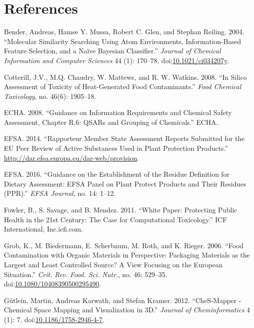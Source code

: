 \documentclass[]{achemso}
\begin{document}
\section*{References}\label{references}

\hypertarget{refs}{}
\hypertarget{ref-doi:10.1021ux2fci034207y}{}
Bender, Andreas, Hamse Y. Mussa, Robert C. Glen, and Stephan Reiling.
2004. ``Molecular Similarity Searching Using Atom Environments,
Information-Based Feature Selection, and a Naïve Bayesian Classifier.''
\emph{Journal of Chemical Information and Computer Sciences} 44 (1):
170--78.
doi:\href{https://doi.org/10.1021/ci034207y}{10.1021/ci034207y}.

\hypertarget{ref-Cotterill2008}{}
Cotterill, J.V., M.Q. Chaudry, W. Mattews, and R. W. Watkins. 2008. ``In
Silico Assessment of Toxicity of Heat-Generated Food Contaminants.''
\emph{Food Chemical Toxicology}, no. 46(6): 1905--18.

\hypertarget{ref-ECHA2008}{}
ECHA. 2008. ``Guidance on Information Requirements and Chemical Safety
Assessment, Chapter R.6: QSARs and Grouping of Chemicals.'' ECHA.

\hypertarget{ref-EFSA2014}{}
EFSA. 2014. ``Rapporteur Member State Assessment Reports Submitted for
the EU Peer Review of Active Substances Used in Plant Protection
Products.'' \url{http://dar.efsa.europa.eu/dar-web/provision}.

\hypertarget{ref-EFSA2016}{}
EFSA. 2016. ``Guidance on the Establishment of the Residue Definition
for Dietary Assessment: EFSA Panel on Plant Protect Products and Their
Residues (PPR).'' \emph{EFSA Journal}, no. 14: 1--12.

\hypertarget{ref-Fowler2011}{}
Fowler, B., S. Savage, and B. Mendez. 2011. ``White Paper: Protecting
Public Health in the 21st Century: The Case for Computational
Toxicology.'' ICF International, Inc.icfi.com.

\hypertarget{ref-Grob2006}{}
Grob, K., M. Biedermann, E. Scherbaum, M. Roth, and K. Rieger. 2006.
``Food Contamination with Organic Materials in Perspective: Packaging
Materials as the Largest and Least Controlled Source? A View Focusing on
the European Situation.'' \emph{Crit. Rev. Food. Sci. Nutr.}, no. 46:
529--35.
doi:\href{https://doi.org/10.1080/10408390500295490}{10.1080/10408390500295490}.

\hypertarget{ref-Guetlein2012}{}
Gütlein, Martin, Andreas Karwath, and Stefan Kramer. 2012. ``CheS-Mapper
- Chemical Space Mapping and Visualization in 3D.'' \emph{Journal of
Cheminformatics} 4 (1): 7.
doi:\href{https://doi.org/10.1186/1758-2946-4-7}{10.1186/1758-2946-4-7}.
\end{document}
